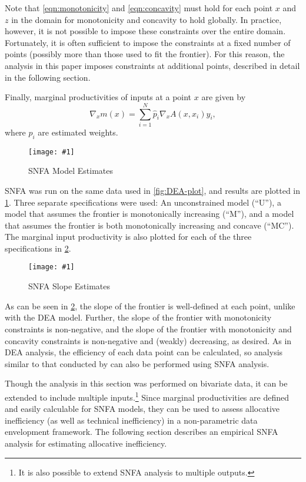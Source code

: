 \documentclass[twocolumn]{article}
\newcommand{\img}[1]{\texttt{[image: \#1]}}
\begin{document}
Note that \cref{eqn:monotonicity} and \cref{eqn:concavity} must hold for each point $x$ and $z$ in the domain for monotonicity and concavity to hold globally. In practice, however, it is not possible to impose these constraints over the entire domain. Fortunately, it is often sufficient to impose the constraints at a fixed number of points (possibly more than those used to fit the frontier). For this reason, the analysis in this paper imposes constraints at additional points, described in detail in the following section.

Finally, marginal productivities of inputs at a point $x$ are given by
\begin{equation}
	\nabla_x m(x) = \sum_{i=1}^N \hat{p}_i \nabla_x A(x, x_i) y_i,
\end{equation}
where $\hat{p}_i$ are estimated weights.

\begin{figure}
	\img{R/snfa-plot.pdf}
	\caption{SNFA Model Estimates}
	\label{fig:SNFA-plot}
\end{figure}

SNFA was run on the same data used in \cref{fig:DEA-plot}, and results are plotted in \cref{fig:SNFA-plot}. Three separate specifications were used: An unconstrained model (``U''), a model that assumes the frontier is monotonically increasing (``M''), and a model that assumes the frontier is both monotonically increasing and concave (``MC''). The marginal input productivity is also plotted for each of the three specifications in \cref{fig:SNFA-grad-plot}.

\begin{figure}
	\img{R/snfa-grad-plot.pdf}
	\caption{SNFA Slope Estimates}
	\label{fig:SNFA-grad-plot}
\end{figure}

As can be seen in \cref{fig:SNFA-grad-plot}, the slope of the frontier is well-defined at each point, unlike with the DEA model. Further, the slope of the frontier with monotonicity constraints is non-negative, and the slope of the frontier with monotonicity and concavity constraints is non-negative and (weakly) decreasing, as desired. As in DEA analysis, the efficiency of each data point can be calculated, so analysis similar to that conducted by \cite{Fare} can also be performed using SNFA analysis.

Though the analysis in this section was performed on bivariate data, it can be extended to include multiple inputs.\footnote{It is also possible to extend SNFA analysis to multiple outputs.} Since marginal productivities are defined and easily calculable for SNFA models, they can be used to assess allocative inefficiency (as well as technical inefficiency) in a non-parametric data envelopment framework. The following section describes an empirical SNFA analysis for estimating allocative inefficiency.
\end{document}
